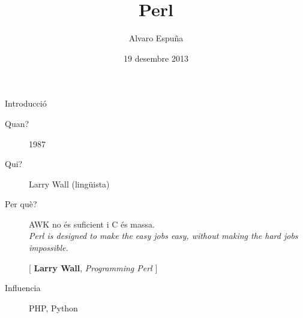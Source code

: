 \documentclass{beamer}
\title{Perl}
\author{Alvaro Espuña}
\date{19 desembre 2013}
\newcommand{\cita}[1]{%
  \begin{flushright}%
    \tiny{[ #1 ]}%
  \end{flushright} %
}
\begin{document}
\frame{\titlepage}

\begin{frame}{Introducció}
  \begin{description}
    \item[Quan?] 1987
    \item[Qui?] Larry Wall (lingüista)
    \item[Per què?] AWK no és suficient i C és massa. \\[0.1cm]
      \emph{Perl is designed to make the easy jobs easy, without
        making the hard jobs impossible.}  \cita{\textbf{Larry Wall},
        \emph{Programming Perl}}
    \item[Influencia] PHP, Python
  \end{description}
\end{frame}
\end{document}
